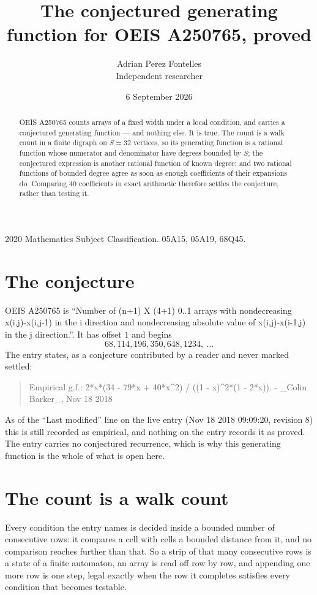 \documentclass[11pt,a4paper]{article}
\title{The conjectured generating function for OEIS A250765, proved}
\author{Adrian Perez Fontelles\\ \small Independent researcher}
\date{6 September 2026}
\theoremstyle{plain}
\theoremstyle{definition}
\begin{document}
\maketitle

\begin{abstract}
OEIS A250765 counts arrays of a fixed width under a local condition, and carries a conjectured
generating function --- and nothing else. It is true. The count is a walk count in a finite
digraph on $S=32$ vertices, so its generating function is a rational function whose numerator
and denominator have degrees bounded by $S$; the conjectured expression is another rational
function of known degree; and two rational functions of bounded degree agree as soon as enough
coefficients of their expansions do. Comparing $40$ coefficients in exact arithmetic
therefore settles the conjecture, rather than testing it.
\end{abstract}

\noindent\small 2020 Mathematics Subject Classification. 05A15, 05A19, 68Q45.\normalsize

\section{The conjecture}

OEIS A250765 is ``Number of (n+1) X (4+1) 0..1 arrays with nondecreasing x(i,j)-x(i,j-1) in the i direction and nondecreasing absolute value of x(i,j)-x(i-1,j) in the j direction.''. It has offset $1$ and begins
\[
68, 114, 196, 350, 648, 1234,\ \dots
\]
The entry states, as a conjecture contributed by a reader and never marked settled:
\begin{quote}
Empirical g.f.: 2*x*(34 - 79*x + 40*x\^{}2) / ((1 - x)\^{}2*(1 - 2*x)). - \_Colin Barker\_, Nov 18 2018
\end{quote}
As of the ``Last modified'' line on the live entry (Nov 18 2018 09:09:20, revision 8) this is still
recorded as empirical, and nothing on the entry records it as proved. The entry carries no
conjectured recurrence, which is why this generating function is the whole of what is open
here.

\section{The count is a walk count}

Every condition the entry names is decided inside a bounded number of consecutive rows: it
compares a cell with cells a bounded distance from it, and no comparison reaches further than
that. So a strip of that many consecutive rows is a state of a finite automaton, an array is
read off row by row, and appending one more row is one step, legal exactly when the row it
completes satisfies every condition that becomes testable.
\end{document}
